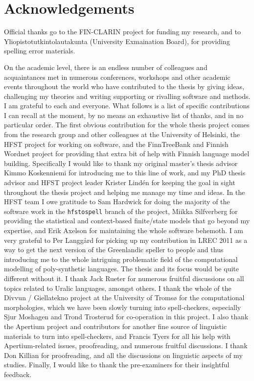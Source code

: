 \documentclass[officiallayout,final]{unihelcompling}
\begin{document}
\section*{Acknowledgements}
\label{sec:acknowledgements}

Official thanks go to the FIN-CLARIN project for funding my research, and to
Yliopistotutkintolautakunta (University Exmaination Board), for providing
spelling error materials.

On the academic level, there is an endless number of colleagues and
acquaintances met in numerous conferences, workshops and other academic events
throughout the world who have contributed to the thesis by giving ideas,
challenging my theories and writing supporting or rivalling software and
methods. I am grateful to each and everyone. What follows is a list of
specific contributions I can recall at the moment, by no means an exhaustive
list of thanks, and in no particular order.  The first obvious contribution for
the whole thesis project comes from the research group and other colleagues at
the University of Helsinki, the HFST project for working on software, and the
FinnTreeBank and Finnish Wordnet project for providing that extra bit of help
with Finnish language model building. Specifically I would like to thank my
original master's thesis advisor Kimmo Koskenniemi for introducing me to this
line of work, and my PhD thesis advisor and HFST project leader Krister Lindén
for keeping the goal in sight throughout the thesis project and helping me
manage my time and ideas.  In the HFST team I owe gratitude to Sam Hardwick for
doing the majority of the software work in the \texttt{hfstospell} branch of
the project, Miikka Silfverberg for providing the statistical and context-based
finite\-/state models that go beyond my expertise, and Erik Axelson for
maintaining the whole software behemoth.  I am very grateful to Per Langgård
for picking up my contribution in LREC 2011 as a way to get the next version of
the Greenlandic speller to people and thus introducing me to the whole
intriguing problematic field of the computational modelling of poly-synthetic
languages. The thesis and its focus would be quite different without it.  I
thank Jack Rueter for numerous fruitful discussions on all topics related to
Uralic languages, amongst others.  I thank the whole of the Divvun /
Giellatekno project at the University of Tromsø for the computational
morphologies, which we have been slowly turning into spell-checkers, especially
Sjur Moshagen and Trond Trosterud for co-operation in this project. I also
thank the Apertium project and contributors for another fine source of
linguistic materials to turn into spell-checkers, and Francis Tyers for all his
help with Apertium-related issues, proofreading, and numerous fruitful
discussions. I thank Don Killian for proofreading, and all the discussions on
linguistic aspects of my studies. Finally, I would like to thank the
pre-examiners for their insightful feedback.
\end{document}
